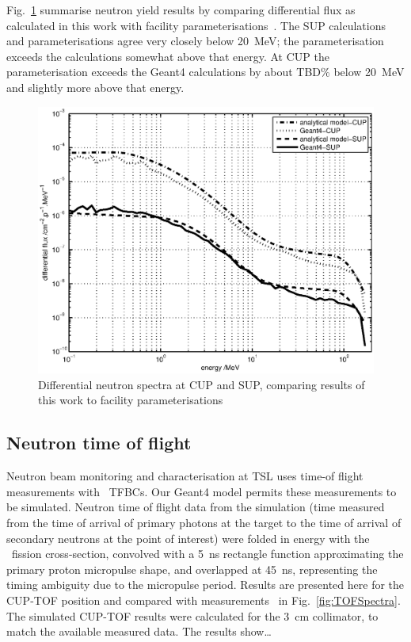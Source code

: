 \documentclass[11pt,a4paper]{IEEEtran}
\let\MYoriglatexcaption\caption
\renewcommand{\caption}[2][\relax]{\MYoriglatexcaption[#2]{#2}}
\def\U238{\BPChem{\^{238}U}}
\begin{document}
Fig.~\ref{fig:DifferentialSpectra} summarise neutron yield results by comparing differential flux as calculated in this work with facility parameterisations~\cite{Prokofiev2009,Prokofiev14}.
The SUP calculations and parameterisations agree very closely below \SI{20}{\MeV}; the parameterisation exceeds the calculations somewhat above that energy.
At CUP the parameterisation exceeds the Geant4 calculations by about TBD\% below \SI{20}{\MeV} and slightly more above that energy.

\begin{figure}[t]
    \centering
    \includegraphics[width=0.9\columnwidth]{DiffYieldComparedSUPCUP10.eps}
    \caption{
        Differential neutron spectra at CUP and SUP, comparing results of this work to facility parameterisations~\cite{Prokofiev2009,Prokofiev14}
    }
    \label{fig:DifferentialSpectra}
\end{figure}

\subsection{Neutron time of flight}
Neutron beam monitoring and characterisation at TSL uses time-of flight measurements with \U238\ TFBCs.
Our Geant4 model permits these measurements to be simulated.
Neutron time of flight data from the simulation (time measured from the time of arrival of primary photons at the target to the time of arrival of secondary neutrons at the point of interest) were folded in energy with the \U238\ fission cross-section, convolved with a \SI{5}{\ns} rectangle function approximating the primary proton micropulse shape, and overlapped at \SI{45}{\ns}, representing the timing ambiguity due to the micropulse period.
Results are presented here for the CUP-TOF position and compared with measurements~\cite{Prokofiev14} in Fig.~\ref{fig:TOFSpectra}.
The simulated CUP-TOF results were calculated for the \SI{3}{\cm} collimator, to match the available measured data.
The results show\ldots
{}
\end{document}
